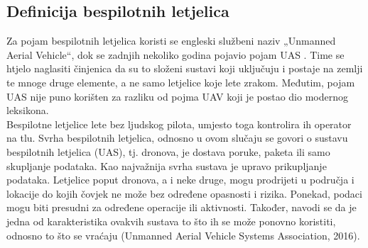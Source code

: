 \documentclass[times, utf8, diplomski]{fer}
\begin{document}
\subsection{Definicija bespilotnih letjelica}
Za pojam bespilotnih letjelica koristi se engleski službeni naziv „Unmanned Aerial Vehicle“,  dok  se  zadnjih  nekoliko  godina  pojavio  pojam  UAS  . Time se htjelo naglasiti činjenica da su to složeni sustavi koji uključuju i postaje na zemlji te mnoge druge elemente, a ne samo letjelice koje lete zrakom. Međutim, pojam UAS nije puno korišten za razliku od pojma UAV koji je postao dio modernog leksikona.\\
Bespilotne letjelice lete bez ljudskog pilota, umjesto toga kontrolira ih operator na tlu. Svrha bespilotnih letjelica, odnosno u ovom slučaju se govori o sustavu bespilotnih letjelica (UAS),  tj.  dronova, je  dostava poruke,  paketa  ili  samo  skupljanje  podataka. Kao najvažnija svrha sustava je upravo prikupljanje podataka. Letjelice poput dronova, a i neke druge, mogu prodrijeti  u  područja  i  lokacije  do  kojih  čovjek  ne  može  bez  određene  opasnosti  i  rizika. Ponekad, podaci mogu biti presudni za određene operacije ili aktivnosti. Također, navodi se da je jedna od karakteristika ovakvih sustava to što ih se može ponovno koristiti, odnosno to što se vraćaju (Unmanned Aerial Vehicle Systems Association, 2016).
\end{document}

